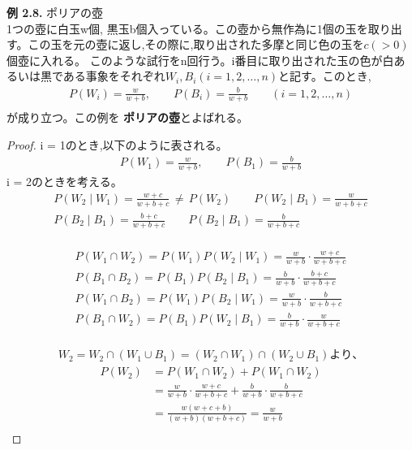 \documentclass[dvipdfmx,10pt, a4j]{jarticle}
\theoremstyle{definition}
\begin{document}
    \noindent
    \textbf{例 2.8.} ポリアの壺\\
    1つの壺に白玉w個, 黒玉b個入っている。この壺から無作為に1個の玉を取り出す。この玉を元の壺に返し,その際に,取り出された多摩と同じ色の玉を$c(>0)$個壺に入れる。
    このような試行をn回行う。i番目に取り出された玉の色が白あるいは黒である事象をそれぞれ$W_i, B_i(i=1,2,\dots,n)$と記す。このとき,\\
    \begin{align*}
        P(W_i) = \frac{w}{w+b},\qquad P(B_i) = \frac{b}{w+b} \qquad(i=1,2,\dots,n)\\
    \end{align*}
    が成り立つ。この例を \textbf{ポリアの壺}とよばれる。\\
    \begin{proof}
        i = 1のとき,以下のように表される。\\
        \begin{align*}
            P(W_1) = \frac{w}{w+b}, \qquad P(B_1) = \frac{b}{w+b}
        \end{align*}
        i = 2のときを考える。\\
        \begin{align*}
            P(W_2 \mid W_1) = \frac{w + c}{w + b + c} \, \neq \, P(W_2) \qquad P(W_2 \mid B_1) = \frac{w}{w + b + c}\\
            P(B_2 \mid B_1) = \frac{b + c}{w + b + c} \qquad P(B_2 \mid B_1) = \frac{b}{w + b + c}\\
        \end{align*}

        \begin{align*}
            P(W_1 \cap W_2) = P(W_1)P(W_2 \mid W_1) = \frac{w}{w+b} \cdot \frac{w+c}{w+b+c}\\
            P(B_1 \cap B_2) = P(B_1)P(B_2 \mid B_1) = \frac{b}{w+b} \cdot \frac{b+c}{w+b+c}\\
            P(W_1 \cap B_2) = P(W_1)P(B_2 \mid W_1) = \frac{w}{w+b} \cdot \frac{b}{w+b+c}\\
            P(B_1 \cap W_2) = P(B_1)P(W_2 \mid B_1) = \frac{b}{w+b} \cdot \frac{w}{w+b+c}\\
        \end{align*}

        \begin{align*}
            W_2 = W_2 \cap (W_1 \cup B_1) = (W_2 \cap W_1) \cap (W_2 \cup B_1) より、
        \end{align*}
        \begin{align*}
            P(W_2) &= P(W_1 \cap W_2) + P(W_1 \cap W_2)\\
            &= \frac{w}{w+b} \cdot \frac{w+c}{w+b+c} + \frac{b}{w+b} \cdot \frac{b}{w+b+c}\\
            &= \frac{w(w+c+b)}{(w+b)(w+b+c)} = \frac{w}{w+b}\\
        \end{align*}
    \end{proof}
\end{document}
